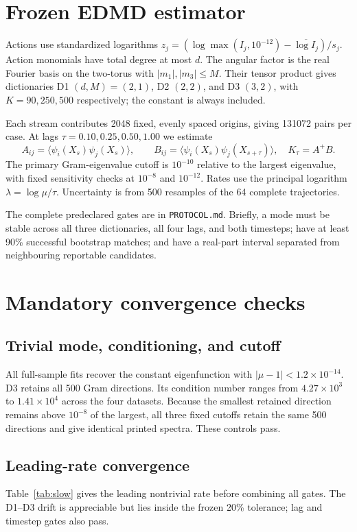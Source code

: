 \documentclass[10pt]{article}
\begin{document}
\section{Frozen EDMD estimator}
Actions use standardized logarithms
$z_j=(\log\max(I_j,10^{-12})-\overline{\log I_j})/s_j$.
Action monomials have total degree at most $d$.  The angular factor is the real
Fourier basis on the two-torus with $|m_1|,|m_3|\le M$.  Their tensor product
gives dictionaries D1 $(d,M)=(2,1)$, D2 $(2,2)$, and D3 $(3,2)$, with
$K=90,250,500$ respectively; the constant is always included.

Each stream contributes 2048 fixed, evenly spaced origins, giving 131072 pairs
per case.  At lags $\tau=0.10,0.25,0.50,1.00$ we estimate
\[
A_{ij}=\langle\psi_i(X_s)\psi_j(X_s)\rangle,\qquad
B_{ij}=\langle\psi_i(X_s)\psi_j(X_{s+\tau})\rangle,
\quad K_\tau=A^+B.
\]
The primary Gram-eigenvalue cutoff is $10^{-10}$ relative to the largest
eigenvalue, with fixed sensitivity checks at $10^{-8}$ and $10^{-12}$.
Rates use the principal logarithm $\lambda=\log\mu/\tau$.  Uncertainty is from
500 resamples of the 64 complete trajectories.

The complete predeclared gates are in \texttt{PROTOCOL.md}.  Briefly, a mode
must be stable across all three dictionaries, all four lags, and both
timesteps; have at least 90\% successful bootstrap matches; and have a
real-part interval separated from neighbouring reportable candidates.

\section{Mandatory convergence checks}
\subsection{Trivial mode, conditioning, and cutoff}
All full-sample fits recover the constant eigenfunction with
$|\mu-1|<1.2\times10^{-14}$.  D3 retains all 500 Gram directions.  Its
condition number ranges from $4.27\times10^3$ to $1.41\times10^4$ across the
four datasets.  Because the smallest retained direction remains above
$10^{-8}$ of the largest, all three fixed cutoffs retain the same 500
directions and give identical printed spectra.  These controls pass.

\subsection{Leading-rate convergence}
Table~\ref{tab:slow} gives the leading nontrivial rate before combining all
gates.  The D1--D3 drift is appreciable but lies inside the frozen 20\%
tolerance; lag and timestep gates also pass.
\end{document}
